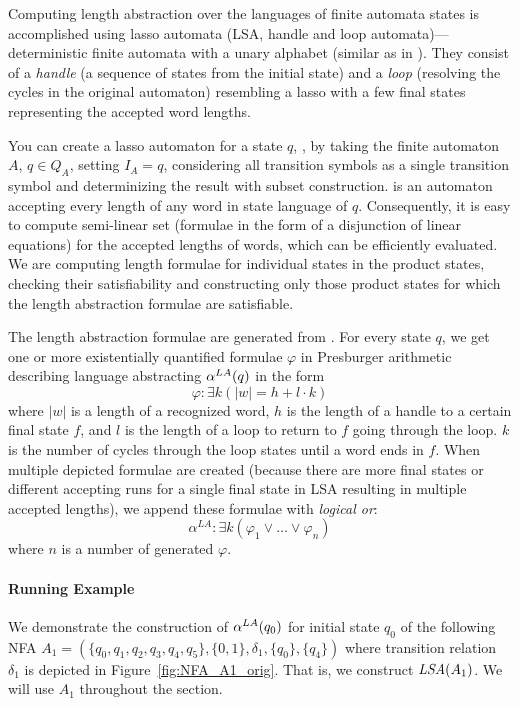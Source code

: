 Computing length abstraction over the languages of finite automata states is accomplished using lasso automata (LSA, handle and loop automata)---deterministic finite automata with a unary alphabet (similar as in \cite{10.1007/978-3-319-08867-9_10}). They consist of a \emph{handle} (a sequence of states from the initial state) and a \emph{loop} (resolving the cycles in the original automaton) resembling a lasso with a few final states representing the accepted word lengths.

You can create a lasso automaton for a state $q$, , by taking the finite automaton $A$, $q \in Q_A$, setting $ I_A = {q} $, considering all transition symbols as a single transition symbol and determinizing the result with subset construction.  is an automaton accepting every length of any word in state language of $q$. Consequently, it is easy to compute semi-linear set (formulae in the form of a disjunction of linear equations) for the accepted lengths of words, which can be efficiently evaluated. We are computing length formulae for individual states in the product states, checking their satisfiability and constructing only those product states for which the length abstraction formulae are satisfiable.

The length abstraction formulae are generated from . For every state $q$, we get one or more existentially quantified formulae $\varphi$ in Presburger arithmetic describing language abstracting $\alpha^{LA}(q)$ in the form
\[
    \varphi: \exists k ( |w| = h + l \cdot k )
\]
where $|w|$ is a length of a recognized word, $h$ is the length of a handle to a certain final state $f$, and $l$ is the length of a loop to return to $f$ going through the loop. $k$ is the number of cycles through the loop states until a word ends in $f$. When multiple depicted formulae are created (because there are more final states or different accepting runs for a single final state in LSA resulting in multiple accepted lengths), we append these formulae with \emph{logical or}:
\[
    \alpha^{LA} : \exists k ( \varphi_1 \lor \ldots \lor \varphi_n )
\]
where $n$ is a number of generated $\varphi$.

\paragraph{Running Example}

We demonstrate the construction of $\alpha^{LA}(q_0)$ for initial state $q_0$ of the following NFA $A_1 = (\{q_0, q_1, q_2, q_3, q_4, q_5\}, \{0, 1\}, \delta_1, \{q_0\}, \{q_4\})$ where transition relation $\delta_1$ is depicted in Figure~\ref{fig:NFA_A1_orig}. That is, we construct $\emph{LSA}(A_1)$. We will use $A_1$ throughout the section.

